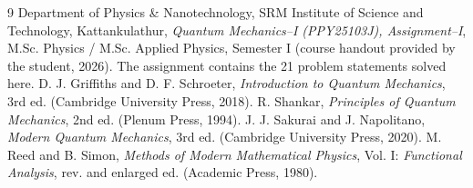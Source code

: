 \documentclass[11pt,a4paper]{article}
\begin{document}
\begin{thebibliography}{9}
 Department of Physics \& Nanotechnology, SRM Institute of Science and Technology, Kattankulathur, \emph{Quantum Mechanics--I (PPY25103J), Assignment--I}, M.Sc. Physics / M.Sc. Applied Physics, Semester I (course handout provided by the student, 2026). The assignment contains the 21 problem statements solved here.
 D. J. Griffiths and D. F. Schroeter, \emph{Introduction to Quantum Mechanics}, 3rd ed. (Cambridge University Press, 2018).
 R. Shankar, \emph{Principles of Quantum Mechanics}, 2nd ed. (Plenum Press, 1994).
 J. J. Sakurai and J. Napolitano, \emph{Modern Quantum Mechanics}, 3rd ed. (Cambridge University Press, 2020).
 M. Reed and B. Simon, \emph{Methods of Modern Mathematical Physics}, Vol. I: \emph{Functional Analysis}, rev. and enlarged ed. (Academic Press, 1980).
\end{thebibliography}
\end{document}

